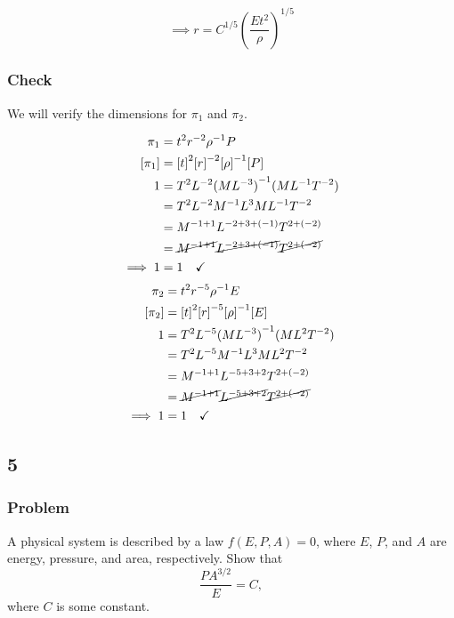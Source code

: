 \documentclass[12pt]{article}
\begin{document}
  \begin{equation*}
    \boxed{\implies r = C^{1/5}{\left(\frac{Et^2}{\rho}\right)}^{1/5}}
  \end{equation*}

  \subsubsection*{Check}
  We will verify the dimensions for $\pi_1$ and $\pi_2$.

  \begin{equation*}
    \begin{aligned}
      \pi_1 &= t^2r^{-2}\rho^{-1}P \\
      [\pi_1] &= {[t]}^2{[r]}^{-2}{[\rho]}^{-1}[P] \\
      1 &= T^2L^{-2}{(ML^{-3})}^{-1}(ML^{-1}T^{-2}) \\
      &= T^2L^{-2}M^{-1}L^{3}ML^{-1}T^{-2} \\
      &= M^{-1+1}L^{-2+3+(-1)}T^{2+(-2)} \\
      &= \cancel{M^{-1+1}}\cancel{L^{-2+3+(-1)}}\cancel{T^{2+(-2)}} \\
      \implies 1 &= 1 \quad\checkmark \\
    \end{aligned}
  \end{equation*}
  \begin{equation*}
    \begin{aligned}
      \pi_2 &= t^{2} r^{-5} \rho^{-1} E  \\
      [\pi_2] &= {[t]}^{2} {[r]}^{-5} {[\rho]}^{-1} [E] \\
      1 &= T^2 L^{-5} {(ML^{-3})}^{-1} (ML^2T^{-2}) \\
      &= T^2 L^{-5} M^{-1}L^{3} ML^2T^{-2} \\
      &= M^{-1+1} L^{-5+3+2} T^{2+(-2)} \\
      &= \cancel{M^{-1+1}} \cancel{L^{-5+3+2}} \cancel{T^{2+(-2)}} \\
      \implies 1 &= 1 \quad\checkmark \\
    \end{aligned}
  \end{equation*}

\subsection{5}
  \subsubsection*{Problem}
  A physical system is described by a law $f(E,P,A)=0$, where $E$, $P$, and $A$
  are energy, pressure, and area, respectively. Show that
  \begin{equation}
    \label{eq:5-problem}
    \frac{PA^{3/2}}{E} = C,
  \end{equation}
  where $C$ is some constant.
\end{document}
